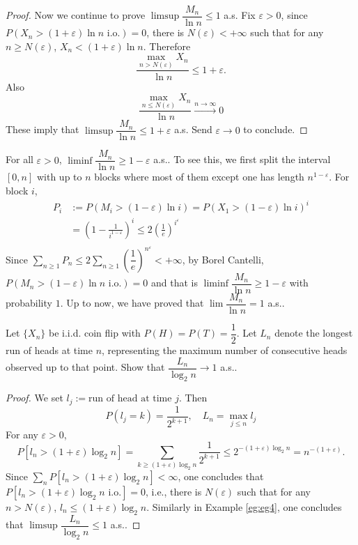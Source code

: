 \documentclass[11pt,singlecolumn, openany, citestyle=authoryear]{elegantbook}
\begin{document}
\begin{CJK}{UTF8}{gbsn}
\begin{proof}
    Now we continue to prove $\limsup\dfrac{M_n}{\ln n}\leqslant 1$ a.s. Fix $\varepsilon>0$,
    since $P(X_n>(1+\varepsilon)\ln n \text{ i.o.})=0$, there is $N(\varepsilon)<+\infty$
    such that for any $n\geqslant N(\varepsilon)$, $X_n<(1+\varepsilon)\ln n$. 
    Therefore 
    $$
    \frac{\max_{n> N(\varepsilon)} X_n}{\ln n}\leqslant 1+\varepsilon.
    $$
    Also 
    $$
    \frac{\max_{n\leqslant N(\varepsilon)}X_n}{\ln n} \overset{n\to\infty}{\longrightarrow} 0
    $$
    These imply that $\limsup \dfrac{M_n}{\ln n}\leqslant 1+\varepsilon$ a.s. Send $\varepsilon \to 0$
    to conclude.
\end{proof}
\begin{note}
    For all $\varepsilon>0$, $\liminf \dfrac{M_n}{\ln n}\geqslant 1-\varepsilon$ a.s..
    To see this, we first split the interval $[0,n]$ with up to $n$ blocks where 
    most of them except one has length $n^{1-\varepsilon}$.
    For block $i$, 
    \begin{align*}
    P_i &:= P(M_{i}>(1-\varepsilon)\ln i)=
    P(X_1 > (1-\varepsilon)\ln i)^{i}\\
    &= \left(
        1-\frac{1}{i^{1-\varepsilon}}
    \right)^{i}\leqslant 2\left(\frac{1}{e}\right)^{i^\varepsilon}\\
    \end{align*}
    Since $\displaystyle \sum_{n\geqslant 1}P_n \leqslant 2 \sum_{n\geqslant 1}
    \left(\dfrac{1}{e}\right)^{n^{\varepsilon}}<+\infty$, by Borel Cantelli, 
    $P(M_n>(1-\varepsilon)\ln n \text{ i.o.})=0$ and that is $\liminf \dfrac{M_n}{\ln n}\geqslant 
    1-\varepsilon$ with probability $1$. Up to now, we have proved that 
    $\lim \dfrac{M_n}{\ln n}=1$ a.s..
\end{note}
\begin{example}
    Let $\{X_n\}$ be i.i.d. coin flip with $P(H)=P(T)=\dfrac{1}{2}$. 
    Let $L_n$ denote the longest run of heads at time $n$, 
    representing the maximum number of consecutive heads observed up to that point.
    Show that $\dfrac{L_n}{\log_2 n}\to 1$ a.s..
\end{example}
\begin{proof}
    We set $l_j:=\text{run of head at time } j$. Then 
    $$
    P(l_j = k)= \frac{1}{2^{k+1}}, \quad L_n = \max_{j\leqslant n}l_j
    $$ 
    For any $\varepsilon>0$, 
    $$
    P[l_n>(1+\varepsilon)\log_2 n] = 
    \sum_{k\geqslant (1+\varepsilon)\log_2 n} \frac{1}{2^{k+1}}\leqslant 
    2^{-(1+\varepsilon)\log_2 n}=n^{-(1+\varepsilon)}.
    $$
    Since $\sum_n  P[l_n>(1+\varepsilon)\log_2 n]<\infty$, one concludes that 
    $P[l_n>(1+\varepsilon)\log_2 n \text{ i.o.}] =0$, i.e., there is $N(\varepsilon)$ such 
    that for any $n>N(\varepsilon)$, $l_n\leqslant (1+\varepsilon)\log_2 n$. Similarly in 
    Example \ref{eg:eg4}, one concludes that $\limsup \dfrac{L_n}{\log_2 n}\leqslant 1$ a.s..


\end{proof}
\end{CJK}
\end{document}
